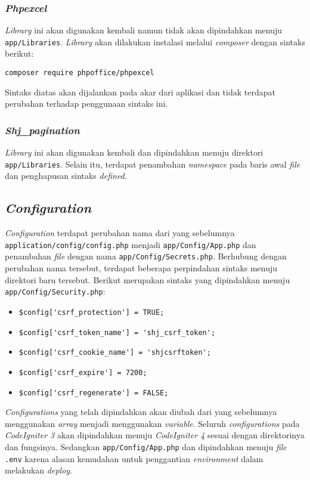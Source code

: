 \subsubsection{\textit{Phpexcel}}
\textit{Library} ini akan digunakan kembali namun tidak akan dipindahkan menuju \texttt{app/Libraries}. \textit{Library} akan dilakukan instalasi melalui \textit{composer} dengan sintaks berikut:
\begin{center}
	\verb|composer require phpoffice/phpexcel|
\end{center}
Sintaks diatas akan dijalankan pada akar dari aplikasi dan tidak terdapat perubahan terhadap penggunaan sintaks ini.
\subsubsection{\textit{Shj\_pagination}}
\textit{Library} ini akan digunakan kembali dan dipindahkan menuju direktori \texttt{app/Libraries}. Selain itu, terdapat penambahan \textit{namespace} pada baris awal \textit{file} dan penghapusan sintaks \textit{defined}.

\subsection{\textit{Configuration}}
\textit{Configuration} terdapat perubahan nama dari yang sebelumnya \texttt{application/config/config.php} menjadi \texttt{app/Config/App.php} dan penambahan \textit{file} dengan nama \texttt{app/Config/Secrets.php}. Berhubung dengan perubahan nama tersebut, terdapat beberapa perpindahan sintaks menuju direktori baru tersebut. Berikut merupakan sintaks yang dipindahkan menuju \texttt{app/Config/Security.php}:
\begin{itemize}
\item \verb|$config['csrf_protection'] = TRUE;|
\item \verb|$config['csrf_token_name'] = 'shj_csrf_token';|
\item \verb|$config['csrf_cookie_name'] = 'shjcsrftoken';|
\item \verb|$config['csrf_expire'] = 7200;|
\item \verb|$config['csrf_regenerate'] = FALSE;|
\end{itemize}

\textit{Configurations} yang telah dipindahkan akan diubah dari yang sebelumnya menggunakan \textit{array} menjadi menggunakan \textit{variable}. Seluruh \textit{configurations} pada \textit{CodeIgniter 3} akan dipindahkan menuju \textit{CodeIgniter 4} sesuai dengan direktorinya dan fungsinya. Sedangkan \texttt{app/Config/App.php} dan dipindahkan menuju \textit{file} \texttt{.env} karena alasan kemudahan untuk penggantian \textit{environment} dalam melakukan \textit{deploy}.

